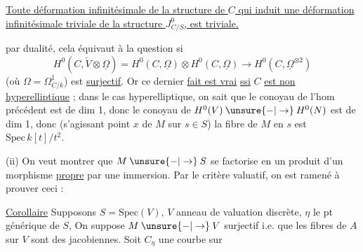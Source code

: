 
 \uline{Toute déformation infinitésimale  de la structure de $C$ qui induit une déformation infinitésimale triviale de la structure $J^0_{C/S}$, est triviale.}

 par dualité, cela équivaut à la question si
\[
H^0(C,\check V\otimes\underline\Omega)=H^0(C,\underline\Omega)\otimes H^0(C,\underline\Omega)\longrightarrow H^0(C,\underline\Omega^{\otimes 2})
\]
(où $\Omega=\Omega^1_{C/k}$) est \uline{surjectif}. Or ce dernier \uline{fait est vrai} \uline{ssi} $C$ \uline{est non hyperelliptique} ; dans le cas  hyperelliptique, on sait que le conoyau de l'hom précédent est de dim 1, donc le conoyau de $H^0(V)\mathbin{\unsure{-|\to}}H^0(N)$ est de dim 1, donc (s'agissant  point $x$ de $M$  sur $s\in S$) la fibre de $M$ en $s$ est $\mathrm{Spec}\,k[t]/t^2$.

(ii) On veut montrer que $M\mathbin{\unsure{-|\to}}S$ se factorise en un produit d'un morphisme \uline{propre} par une immersion. Par le critère valuatif, on est ramené à prouver ceci :

\uline{Corollaire} Supposons $S=\mathrm{Spec}(V)$, $V$ anneau de valuation discrète,  $\eta$ le pt générique de $S$,  On suppose $M\mathbin{\unsure{-|\to}}V$ surjectif i.e. que les fibres de $A$ sur $V$ sont des jacobiennes.  Soit $C_\eta$ une courbe sur

